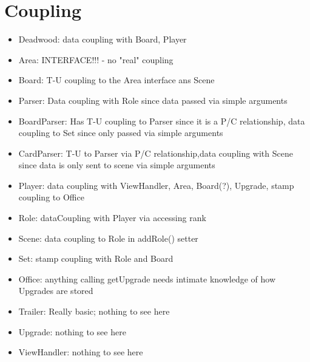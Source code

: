 \documentclass[letterpaper, twoside]{report}
\begin{document}
\chapter{Coupling}
\begin{itemize}
    \item Deadwood: data coupling with Board, Player
    \item Area: INTERFACE!!! - no "real" coupling
    \item Board: T-U coupling to the Area interface ans Scene
    \item Parser: Data coupling with Role since data passed via simple arguments
    \item BoardParser: Has T-U coupling to Parser since it is a P/C relationship, data coupling to Set since only passed via simple arguments
    \item CardParser: T-U to Parser via P/C relationship,data coupling with Scene since data is only sent to scene via simple arguments
    \item Player: data coupling with ViewHandler, Area, Board(?), Upgrade, stamp coupling to Office
    \item Role: dataCoupling with Player via accessing rank
    \item Scene: data coupling to Role in addRole() setter
    \item Set: stamp coupling with Role and Board
    \item Office: anything calling getUpgrade needs intimate knowledge of how Upgrades are stored
    \item Trailer: Really basic; nothing to see here
    \item Upgrade: nothing to see here
    \item ViewHandler: nothing to see here
\end{itemize}
\end{document}
